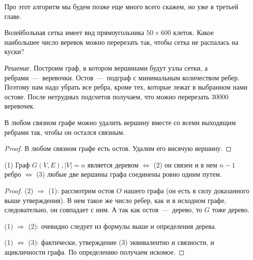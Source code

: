 	Про этот алгоритм мы будем позже еще много всего скажем, но уже в третьей главе.

\begin{example}
	Волейбольная сетка имеет вид прямоугольника $50 \times 600$ клеток. Какое наибольшее число веревок можно перерезать так, чтобы сетка не распалась на куски?
	
	\emph{Решение.} Построим граф, в котором вершинами будут узлы сетки, а ребрами~---~веревочки. Остов~---~подграф с минимальным количеством ребер. Поэтому нам надо убрать все ребра, кроме тех, которые лежат в выбранном нами остове. После нетрудных подсчетов получаем, что можно перерезать $30000$ веревочек.
\end{example}

\begin{statement}
	В любом связном графе можно удалить вершину вместе со всеми выходящим ребрами так, чтобы он остался связным.
	
\begin{proof}
	В любом связном графе есть остов. Удалим его висячую вершину.
\end{proof}
\end{statement}	

\begin{statement}
	(1) Граф $G(V, E), |V| = n$ является деревом $\Leftrightarrow$ (2) он связен и в нем $n-1$ ребро $\Leftrightarrow$ (3) любые две вершины графа соединены ровно одним путем.
	
\begin{proof}
	(2) $\Rightarrow$ (1): рассмотрим остов $O$ нашего графа (он есть в силу доказанного выше утверждения). В нем такое же число ребер, как и в исходном графе, следовательно, он совпадает с ним. А так как остов~---~дерево, то $G$ тоже дерево.
	
	(1) $\Rightarrow$ (2): очевидно следует из формулы выше и определения дерева.
	
	(1) $\Leftrightarrow$ (3): фактически, утверждение (3) эквивалентно и связности, и ацикличности графа. По определению получаем искомое.
\end{proof}
\end{statement}



